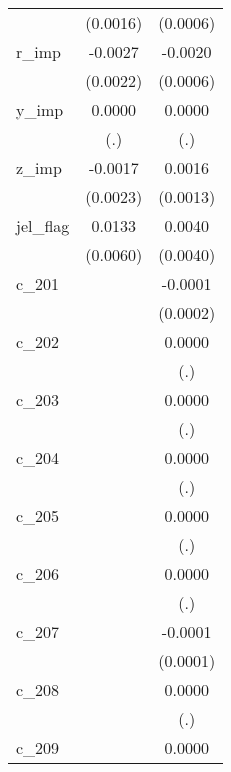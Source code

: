 {\begin{tabular}{l*{2}{c}}
            &    (0.0016)        &    (0.0006)        \\
[1em]
r\_imp       &     -0.0027        &     -0.0020\sym{**}\\
            &    (0.0022)        &    (0.0006)        \\
[1em]
y\_imp       &      0.0000        &      0.0000        \\
            &         (.)        &         (.)        \\
[1em]
z\_imp       &     -0.0017        &      0.0016        \\
            &    (0.0023)        &    (0.0013)        \\
[1em]
jel\_flag    &      0.0133\sym{**}&      0.0040        \\
            &    (0.0060)        &    (0.0040)        \\
[1em]
c\_201       &                    &     -0.0001        \\
            &                    &    (0.0002)        \\
[1em]
c\_202       &                    &      0.0000        \\
            &                    &         (.)        \\
[1em]
c\_203       &                    &      0.0000        \\
            &                    &         (.)        \\
[1em]
c\_204       &                    &      0.0000        \\
            &                    &         (.)        \\
[1em]
c\_205       &                    &      0.0000        \\
            &                    &         (.)        \\
[1em]
c\_206       &                    &      0.0000        \\
            &                    &         (.)        \\
[1em]
c\_207       &                    &     -0.0001        \\
            &                    &    (0.0001)        \\
[1em]
c\_208       &                    &      0.0000        \\
            &                    &         (.)        \\
[1em]
c\_209       &                    &      0.0000        \\

\end{tabular}}
